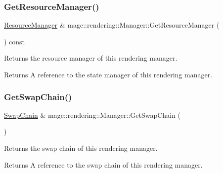\subsubsection{\texorpdfstring{Get\+Resource\+Manager()}{GetResourceManager()}}
{\footnotesize\ttfamily \mbox{\hyperlink{classmage_1_1rendering_1_1_resource_manager}{Resource\+Manager}} \& mage\+::rendering\+::\+Manager\+::\+Get\+Resource\+Manager (\begin{DoxyParamCaption}{ }\end{DoxyParamCaption}) const\hspace{0.3cm}{\ttfamily [noexcept]}}

Returns the resource manager of this rendering manager.

\begin{DoxyReturn}{Returns}
A reference to the state manager of this rendering manager. 
\end{DoxyReturn}
\mbox{\label{classmage_1_1rendering_1_1_manager_a3cfc594583bb0c762375a1283d263fd1}} 
\subsubsection{\texorpdfstring{Get\+Swap\+Chain()}{GetSwapChain()}\hspace{0.1cm}{\footnotesize\ttfamily [1/2]}}
{\footnotesize\ttfamily \mbox{\hyperlink{classmage_1_1rendering_1_1_swap_chain}{Swap\+Chain}} \& mage\+::rendering\+::\+Manager\+::\+Get\+Swap\+Chain (\begin{DoxyParamCaption}{ }\end{DoxyParamCaption})\hspace{0.3cm}{\ttfamily [noexcept]}}

Returns the swap chain of this rendering manager.

\begin{DoxyReturn}{Returns}
A reference to the swap chain of this rendering manager. 
\end{DoxyReturn}
\mbox{\label{classmage_1_1rendering_1_1_manager_a219939c5316dd348822e39c89141d429}} 
